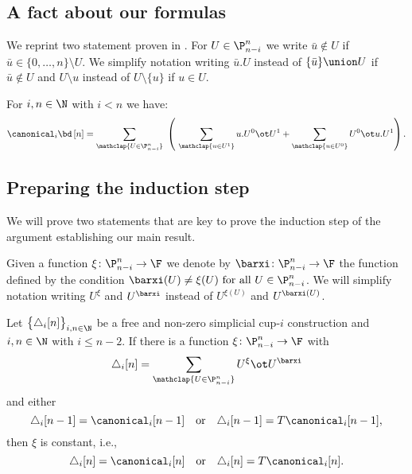 \subsection{A fact about our formulas}\label{ss:fact}

We reprint two statement proven in \cite{medina2023fast_sq}.
For $U \in \P_{n-i}^n$ we write $\bar u \notin U$ if $\bar u \in \{0, \dots, n\} \setminus U$.
We simplify notation writing $\bar u.U$ instead of $\{\bar u\} \union U$ if $\bar u \notin U$ and $U \setminus u$ instead of $U \setminus \{u\}$ if $u \in U$.

\begin{proposition}\label{p:fact}
	For $i,n \in \N$ with $i < n$ we have:
	\[
	\canonical_i \bd \, [n] =
	\sum_{\mathclap{U \in \P_{n-i}^n}} \
	\left(\
	\sum_{\mathclap{u \in U^1}} u.U^0 \ot U^1 +
	\sum_{\mathclap{u \in U^0}} U^0 \ot u.U^1
	\right).
	\]
\end{proposition}


\newpage
{}
\subsection{Preparing the induction step}\label{ss:preparing}

We will prove two statements that are key to prove the induction step of the argument establishing our main result.

\begin{notation*}
	Given a function $\xi \colon \P_{n-i}^n \to \F$ we denote by $\barxi \colon \P_{n-i}^n \to \F$ the function defined by the condition $\barxi(U) \neq \xi(U) \text{ for all } U \in \P_{n-i}^n$.
	We will simplify notation writing $U^\xi$ and $U^{\barxi}$ instead of $U^{\xi(U)}$ and $U^{\barxi(U)}$.
\end{notation*}

\begin{lemma}\label{l:first nail}
	Let $\big\{ \triangle_i [n] \big\}_{i,n\in\N}$ be a free and non-zero simplicial \mbox{cup-$i$} construction and $i,n \in \N$ with $i \leq n-2$.
	If there is a function $\xi \colon \P_{n-i}^n \to \F$ with
	\begin{equation}\label{e:xi and barxi}
		\triangle_i [n] =
		\sum_{\mathclap{U \in \P_{n-i}^n}} U^{\xi} \ot U^{\barxi}
	\end{equation}
	and either
	\[
	\triangle_i [n-1] = \canonical_i [n-1]
	\quad \text{or} \quad
	\triangle_i [n-1] = T\canonical_i [n-1],
	\]
	then $\xi$ is constant, i.e.,
	\[
	\triangle_i [n] = \canonical_i [n]
	\quad \text{or} \quad
	\triangle_i [n] = T \canonical_i [n].
	\]
\end{lemma}

